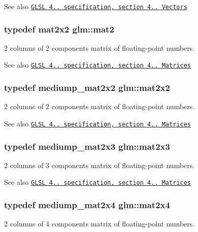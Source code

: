 \begin{DoxySeeAlso}{\-See also}
\href{http://www.opengl.org/registry/doc/GLSLangSpec.4.20.8.pdf}{\tt \-G\-L\-S\-L 4.. specification, section 4.. \-Vectors} 
\end{DoxySeeAlso}
\hypertarget{group__core__types_ga8357ec0aab6f8cf69313592492663c3f}{
\subsubsection[{mat2}]{\setlength{\rightskip}{0pt plus 5cm}typedef mat2x2 {\bf glm\-::mat2}}}\label{group__core__types_ga8357ec0aab6f8cf69313592492663c3f}
2 columns of 2 components matrix of floating-\/point numbers.

\begin{DoxySeeAlso}{\-See also}
\href{http://www.opengl.org/registry/doc/GLSLangSpec.4.20.8.pdf}{\tt \-G\-L\-S\-L 4.. specification, section 4.. \-Matrices} 
\end{DoxySeeAlso}
\hypertarget{group__core__types_gac35d9aae8d7beaceba6d18f6e26261a4}{
\subsubsection[{mat2x2}]{\setlength{\rightskip}{0pt plus 5cm}typedef mediump\-\_\-mat2x2 {\bf glm\-::mat2x2}}}\label{group__core__types_gac35d9aae8d7beaceba6d18f6e26261a4}
2 columns of 2 components matrix of floating-\/point numbers.

\begin{DoxySeeAlso}{\-See also}
\href{http://www.opengl.org/registry/doc/GLSLangSpec.4.20.8.pdf}{\tt \-G\-L\-S\-L 4.. specification, section 4.. \-Matrices} 
\end{DoxySeeAlso}
\hypertarget{group__core__types_gad23070b803932f5f3c9d9c2fd4d64895}{
\subsubsection[{mat2x3}]{\setlength{\rightskip}{0pt plus 5cm}typedef mediump\-\_\-mat2x3 {\bf glm\-::mat2x3}}}\label{group__core__types_gad23070b803932f5f3c9d9c2fd4d64895}
2 columns of 3 components matrix of floating-\/point numbers.

\begin{DoxySeeAlso}{\-See also}
\href{http://www.opengl.org/registry/doc/GLSLangSpec.4.20.8.pdf}{\tt \-G\-L\-S\-L 4.. specification, section 4.. \-Matrices} 
\end{DoxySeeAlso}
\hypertarget{group__core__types_gaa78542b8bfa06cd48c53dcd0d0a00707}{
\subsubsection[{mat2x4}]{\setlength{\rightskip}{0pt plus 5cm}typedef mediump\-\_\-mat2x4 {\bf glm\-::mat2x4}}}\label{group__core__types_gaa78542b8bfa06cd48c53dcd0d0a00707}
2 columns of 4 components matrix of floating-\/point numbers.

